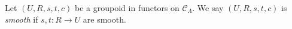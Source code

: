 \begin{definition}
\label{definition-smooth-groupoid-in-functors}
Let $(U, R, s, t, c)$ be a groupoid in functors on $\mathcal{C}_\Lambda$. We
say $(U, R, s, t, c)$ is {\it smooth} if $s, t: R \to U$ are smooth.
\end{definition}